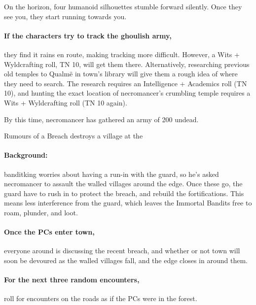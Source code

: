 \begin{multicols}{2}
\begin{boxtext}
  On the horizon, four humanoid silhouettes stumble forward silently.  Once they see you, they start running towards you.

\end{boxtext}

\paragraph{If the characters try to track the ghoulish army,}
they find it rains en route, making tracking more difficult.
However, a Wits + Wyldcrafting roll, TN 10, will get them there.
Alternatively, researching previous old temples to Qualm\"{e} in \gls{town}'s library will give them a rough idea of where they need to search.
The research requires an Intelligence + Academics roll (TN 10), and hunting the exact location of \gls{necromancer}'s crumbling temple requires a Wits + Wyldcrafting roll (TN 10 again).

By this time, \gls{necromancer} has gathered an army of 200 undead.

{\squash Rumours of a Breach}%
{ destroys a village at the }%

\paragraph{Background:}
\Gls{banditking} worries about having a run-in with the \gls{guard}, so he's asked \gls{necromancer} to assault the walled villages around the \gls{edge}.
Once these go, the \gls{guard} have to rush in to protect the breach, and rebuild the fortifications.
This means less interference from the \gls{guard}, which leaves the Immortal Bandits free to roam, plunder, and loot.

\paragraph{Once the PCs enter \gls{town},}
everyone around is discussing the recent breach, and whether or not \gls{town} will soon be devoured as the walled villages fall, and the \gls{edge} closes in around them.

\paragraph{For the next three random encounters,}
roll for encounters on the roads as if the PCs were in the forest.


\end{multicols}
